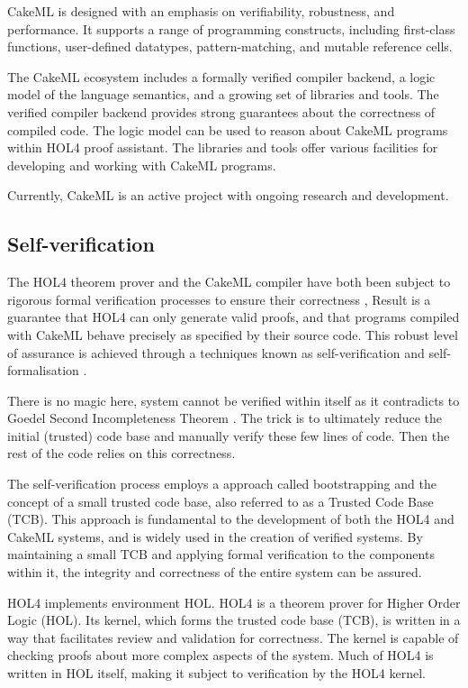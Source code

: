 CakeML is designed with an emphasis on verifiability, robustness, and performance. It supports a range of programming constructs, including first-class functions, user-defined datatypes, pattern-matching, and mutable reference cells.

The CakeML ecosystem includes a formally verified compiler backend, a logic model of the language semantics, and a growing set of libraries and tools. The verified compiler backend provides strong guarantees about the correctness of compiled code. The logic model can be used to reason about CakeML programs within HOL4 proof assistant. The libraries and tools offer various facilities for developing and working with CakeML programs.

Currently, CakeML is an active project with ongoing research and development.

\subsection{Self-verification} 


The HOL4 theorem prover and the CakeML compiler have both been subject to rigorous formal verification processes to ensure their correctness \cite{Myreen2013StepsTV, Harrison2006TowardsSO, Abrahamsson2022CandleAV}, Result is a guarantee that HOL4 can only generate valid proofs, and that programs compiled with CakeML behave precisely as specified by their source code. This robust level of assurance is achieved through a techniques known as self-verification and self-formalisation  \cite{Kumar2016SelfFormalisationOH}. 

There is no magic here, system cannot be verified within itself as it contradicts to Goedel Second Incompleteness Theorem \cite{Gdel1966OnFU}. The trick is to ultimately reduce the initial (trusted) code base and manually verify these few lines of code. Then the rest of the code relies on this correctness.

The self-verification process employs a approach called bootstrapping and the concept of a small trusted code base, also referred to as a Trusted Code Base (TCB). This approach is fundamental to the development of both the HOL4 and CakeML systems, and is widely used in the creation of verified systems. By maintaining a small TCB and applying formal verification to the components within it, the integrity and correctness of the entire system can be assured.

HOL4 implements environment HOL. HOL4 is a theorem prover for Higher Order Logic (HOL). Its kernel, which forms the trusted code base (TCB), is written in a way that facilitates review and validation for correctness. The kernel is capable of checking proofs about more complex aspects of the system. Much of HOL4 is written in HOL itself, making it subject to verification by the HOL4 kernel.

